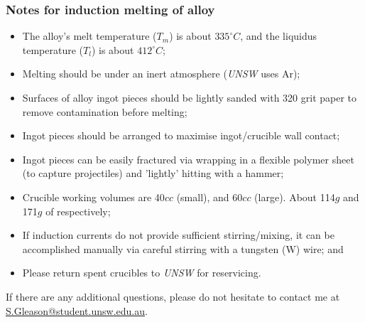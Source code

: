\subsubsection{Notes for induction melting of \MgZnCa alloy}
\begin{itemize}
\item The \MgZnCa alloy's melt temperature ($T_{m}$) is about $335^{\circ}C$, and the liquidus temperature ($T_{l}$) is about $412^{\circ}C$;
\item Melting should be under an inert atmosphere (\textit{UNSW} uses Ar);
\item Surfaces of alloy ingot pieces should be lightly sanded with 320 grit paper to remove contamination before melting;
\item Ingot pieces should be arranged to maximise ingot/crucible wall contact;
\item Ingot pieces can be easily fractured via wrapping in a flexible polymer sheet (to capture projectiles) and 'lightly' hitting with a hammer;
\item Crucible working volumes are 40$cc$ (small), and 60$cc$ (large). About 114$g$ and 171$g$ of \MgZnCa respectively;
\item If induction currents do not provide sufficient stirring/mixing, it can be accomplished manually via careful stirring with a tungsten (W) wire; and
\item Please return spent crucibles to \textit{UNSW} for reservicing. 
\end{itemize}

If there are any additional questions, please do not hesitate to contact me at \href{"mailto:s.gleason@student.unsw.edu.au"}{S.Gleason@student.unsw.edu.au}. 